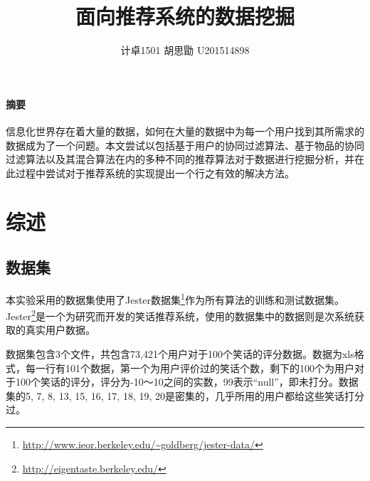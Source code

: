\documentclass{article}
\title{面向推荐系统的数据挖掘}
\author{计卓1501 胡思勖 U201514898}
\begin{document}
\maketitle

\paragraph{摘要}
\label{par:zhai_yao_}
\par 信息化世界存在着大量的数据，如何在大量的数据中为每一个用户找到其所需求的数据成为了一个问题。本文尝试以包括基于用户的协同过滤算法、基于物品的协同过滤算法以及其混合算法在内的多种不同的推荐算法对于数据进行挖掘分析，并在此过程中尝试对于推荐系统的实现提出一个行之有效的解决方法。

\makeatletter
\renewcommand\paragraph{%
    \@startsection{paragraph}{4}{0mm}%
    {-\baselineskip}%
    {.5\baselineskip}%
{\normalfont\normalsize\bfseries}}
\makeatother

\section{综述}
\label{sec:zong_shu_}

\subsection{数据集}
\label{sub:shu_ju_ji_}
\par 本实验采用的数据集使用了Jester数据集\footnote{\url{http://www.ieor.berkeley.edu/~goldberg/jester-data/}}作为所有算法的训练和测试数据集。Jester\footnote{\url{http://eigentaste.berkeley.edu/}}是一个为研究而开发的笑话推荐系统，使用的数据集中的数据则是次系统获取的真实用户数据。
\par 数据集包含3个文件，共包含73,421个用户对于100个笑话的评分数据。数据为xls格式，每一行有101个数据，第一个为用户评价过的笑话个数，剩下的100个为用户对于100个笑话的评分，评分为-10～10之间的实数，99表示``null''，即未打分。数据集的5, 7, 8, 13, 15, 16, 17, 18, 19, 20是密集的，几乎所用的用户都给这些笑话打分过。
\end{document}
